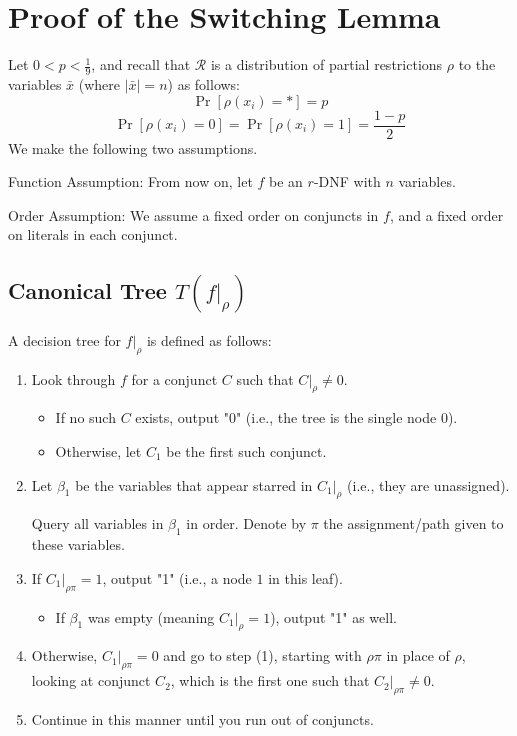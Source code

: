 

\section{Proof of the Switching Lemma}

Let \( 0 < p < \frac{1}{9} \), and recall that  \(\mathcal{R}\) is a distribution of partial restrictions
\(\rho\) to the variables \( \bar{x} \) (where \( |\bar{x}| = n \)) as follows:
\[
\Pr[\rho(x_i) = *] = p
\]
\[
\Pr[\rho(x_i) = 0] = \Pr[\rho(x_i) = 1] = \frac{1 - p}{2}
\]
We make the following two assumptions.

Function Assumption: From now on, let \( f \) be an $r$-DNF with \( n \) variables.

Order Assumption:  We assume a fixed order on conjuncts in \( f \),
and a fixed order on literals in each conjunct.

\subsection{Canonical Tree \( T(f|_{\rho}) \)}

A decision tree for \( f|_{\rho} \) is defined as follows:

\begin{enumerate}
    \item Look through \( f \) for a conjunct \( C \) such that \( C|_{\rho} \neq 0 \).
    \begin{itemize}
        \item If no such \( C \) exists, output "0" (i.e., the tree is the single node \( 0 \)).
        \item Otherwise, let \( C_1 \) be the first such conjunct.
    \end{itemize}
    
    \item Let \( \beta_1 \) be the variables that appear starred in \( C_1|_{\rho} \) (i.e., they are unassigned).
    
    Query all variables in \( \beta_1 \) in order. Denote by \( \pi \) the assignment/path given to these variables.
    
    \item If \( C_1|_{\rho\pi} = 1 \), output "1" (i.e., a node \( 1 \) in this leaf).
    \begin{itemize}
        \item If \( \beta_1 \) was empty (meaning \( C_1|_{\rho} = 1 \)), output "1" as well.
    \end{itemize}
    
    \item Otherwise, \( C_1|_{\rho\pi} = 0 \) and go to step (1), starting with \( \rho\pi \) in place of \( \rho \), looking at conjunct \( C_2 \), which is the first one such that \( C_2|_{\rho\pi} \neq 0 \).
    
    \item Continue in this manner until you run out of conjuncts.
\end{enumerate}

